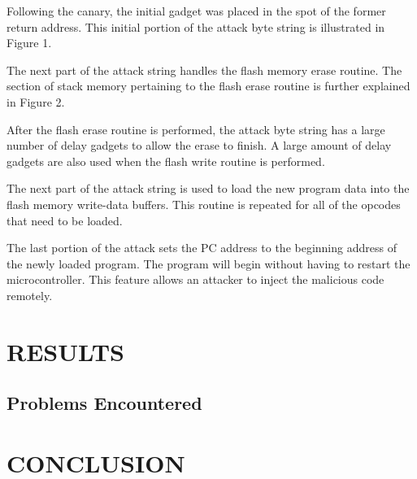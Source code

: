 \documentclass[letterpaper, 10 pt, conference]{ieeeconf}  %
\begin{document}
Following the canary, the initial gadget was placed in the spot of the former return address.  This initial portion of the attack byte string is illustrated in Figure 1.


The next part of the attack string handles the flash memory erase routine.  The section of stack memory pertaining to the flash erase routine is further explained in Figure 2.  


After the flash erase routine is performed, the attack byte string has a large number of delay gadgets to allow the erase to finish.  A large amount of delay gadgets are also used when the flash write routine is performed.

The next part of the attack string is used to load the new program data into the flash memory write-data buffers.  This routine is repeated for all of the opcodes that need to be loaded.

The last portion of the attack sets the PC address to the beginning address of the newly loaded program.  The program will begin without having to restart the microcontroller.  This feature allows an attacker to inject the malicious code remotely.    

\section{RESULTS}

\subsection{Problems Encountered}

\section{CONCLUSION}
\end{document}

